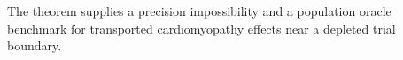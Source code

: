 The theorem supplies a precision impossibility and a population oracle benchmark for transported cardiomyopathy effects near a depleted trial boundary.